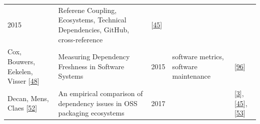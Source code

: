 \documentclass[]{book}
\begin{document}
\begin{longtable}[]{@{}lllll@{}}
\begin{minipage}[t]{0.02\columnwidth}
2015\strut
\end{minipage} & \begin{minipage}[t]{0.24\columnwidth}\raggedright\strut
Referene Coupling, Ecosystems, Technical Dependencies, GitHub,
cross-reference\strut
\end{minipage} & \begin{minipage}[t]{0.16\columnwidth}\raggedright\strut
{[}\protect\hyperlink{ref-Constantinou2017}{45}{]}\strut
\end{minipage}\tabularnewline
\begin{minipage}[t]{0.12\columnwidth}\raggedright\strut
Cox, Bouwers, Eekelen, Visser
{[}\protect\hyperlink{ref-Cox2015}{48}{]}\strut
\end{minipage} & \begin{minipage}[t]{0.31\columnwidth}\raggedright\strut
Measuring Dependency Freshness in Software Systems\strut
\end{minipage} & \begin{minipage}[t]{0.02\columnwidth}\raggedright\strut
2015\strut
\end{minipage} & \begin{minipage}[t]{0.24\columnwidth}\raggedright\strut
software metrics, software maintenance\strut
\end{minipage} & \begin{minipage}[t]{0.16\columnwidth}\raggedright\strut
{[}\protect\hyperlink{ref-Kikas2017}{96}{]}\strut
\end{minipage}\tabularnewline
\begin{minipage}[t]{0.12\columnwidth}\raggedright\strut
Decan, Mens, Claes {[}\protect\hyperlink{ref-Decan2017}{52}{]}\strut
\end{minipage} & \begin{minipage}[t]{0.31\columnwidth}\raggedright\strut
An empirical comparison of dependency issues in OSS packaging
ecosystems\strut
\end{minipage} & \begin{minipage}[t]{0.02\columnwidth}\raggedright\strut
2017\strut
\end{minipage} & \begin{minipage}[t]{0.24\columnwidth}\raggedright\strut
\strut
\end{minipage} & \begin{minipage}[t]{0.16\columnwidth}\raggedright\strut
{[}\protect\hyperlink{ref-Abdalkareem2017}{3}{]},
{[}\protect\hyperlink{ref-Constantinou2017}{45}{]},
{[}\protect\hyperlink{ref-Decan2018}{53}{]}\strut
\end{minipage}\tabularnewline

\end{longtable}
\end{document}

